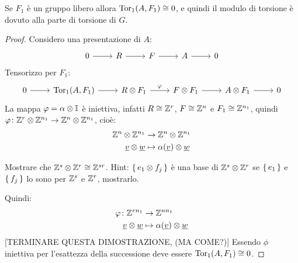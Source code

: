 \begin{lemma}
  Se $ F_1 $ è un gruppo libero allora $ \mathrm{Tor_1}( A,F_1) \cong 0 $, e quindi il modulo
  di torsione è dovuto alla parte di torsione di $ G $.
\end{lemma}
\begin{proof}
  Considero una presentazione di $ A $:
  \[
    \begin{tikzcd}
      0 \rar & R \rar & F \rar & A \rar & 0
    \end{tikzcd}
  \]
  Tensorizzo per $ F_1 $:
  \[
    \begin{tikzcd}
      0 \rar & \tor{A,F_1} \rar & R \otimes F_1 \rar{\phi} & F \otimes F_1 \rar & A \otimes F_1 \rar & 0
    \end{tikzcd}
  \]
  La mappa $ \varphi = \alpha \otimes \mathbb{I}_{} $ è iniettiva, infatti $ R \cong \mathbb{Z}^r $, $ F \cong \mathbb{Z}^n $ e $ F_1 \cong \mathbb{Z}^{n_1} $,
  quindi $ \varphi \colon \mathbb{Z}^r \otimes \mathbb{Z}^{n_1} \to \mathbb{Z}^n \otimes \mathbb{Z}^{n_1} $, cioè:
  \begin{align*}
    \mathbb{Z}^n \otimes \mathbb{Z}^{n_1} & \to  \mathbb{Z}^n \otimes \mathbb{Z}^{n_1} \\
    \underline{v} \otimes \underline{w} & \mapsto \alpha(\underline{v}) \otimes \underline{w}
  \end{align*}
  \begin{exercise}
    Mostrare che $ \mathbb{Z}^s \otimes \mathbb{Z}^r \cong \mathbb{Z}^{sr} $.
    Hint:  $ \set{e_1 \otimes f_j} $ è una base di $ \mathbb{Z}^s \otimes \mathbb{Z}^r $ se $ \set{e_1} $
    e $ \set{f_j} $ lo sono per $ \mathbb{Z}^s $ e $ \mathbb{Z}^r $, mostrarlo.
  \end{exercise}
  Quindi:
  \begin{align*}
    \varphi \colon \mathbb{Z}^{rn_1} & \to \mathbb{Z}^{n n_1} \\
    \underline{v} \otimes \underline{w} & \mapsto \alpha(\underline{v})\otimes \underline{w}
  \end{align*}
  [TERMINARE QUESTA DIMOSTRAZIONE, (MA COME?)]
  Essendo $ \phi $ iniettiva per l'esattezza della successione deve essere $ \mathrm{Tor_1}( A, F_1) \cong 0 $.
\end{proof}

